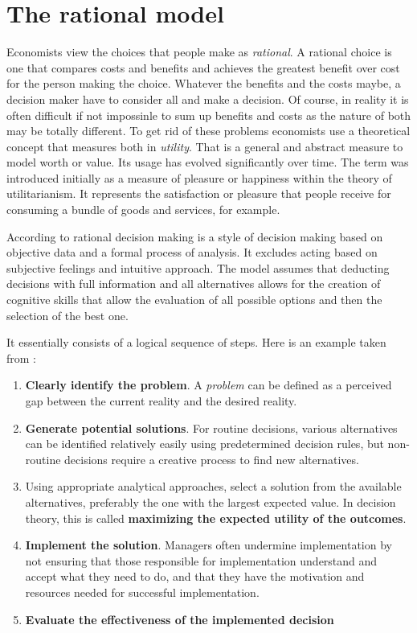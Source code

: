 \documentclass[
  12pt,
  oneside]{book}
\theoremstyle{definition}
\theoremstyle{definition}
\theoremstyle{definition}
\theoremstyle{definition}
\theoremstyle{remark}
\begin{document}
\section{The rational model}\label{the-rational-model}

Economists view the choices that people make as \emph{rational}. A rational choice is one that compares costs and benefits and achieves the greatest benefit over cost for the person making the choice. Whatever the benefits and the costs maybe, a decision maker have to consider all and make a decision. Of course, in reality it is often difficult if not impossinle to sum up benefits and costs as the nature of both may be totally different. To get rid of these problems economists use a theoretical concept that measures both in \emph{utility}. That is a general and abstract measure to model worth or value. Its usage has evolved significantly over time. The term was introduced initially as a measure of pleasure or happiness within the theory of utilitarianism. It represents the satisfaction or pleasure that people receive for consuming a bundle of goods and services, for example.

According to \citet{CEOpedia2021Rational} rational decision making is a style of decision making based on objective data and a formal process of analysis. It excludes acting based on subjective feelings and intuitive approach. The model assumes that deducting decisions with full information and all alternatives allows for the creation of cognitive skills that allow the evaluation of all possible options and then the selection of the best one.

It essentially consists of a logical sequence of steps. Here is an example taken from \citet[p.~13]{Fitzgerald2002Decision}:

\begin{enumerate}
\def\labelenumi{\arabic{enumi}.}
\item
  \textbf{Clearly identify the problem}. A \emph{problem} can be defined as a perceived gap between the current reality and the desired reality.
\item
  \textbf{Generate potential solutions}. For routine decisions, various alternatives can be identified relatively easily using predetermined decision rules, but non-routine decisions require a creative process to find new alternatives.
\item
  Using appropriate analytical approaches, select a solution from the available alternatives, preferably the one with the largest expected value. In decision theory, this is called \textbf{maximizing the expected utility of the outcomes}.
\item
  \textbf{Implement the solution}. Managers often undermine implementation by not ensuring that those responsible for implementation understand and accept what they need to do, and that they have the motivation and resources needed for successful implementation.
\item
  \textbf{Evaluate the effectiveness of the implemented decision}
\end{enumerate}
\end{document}
